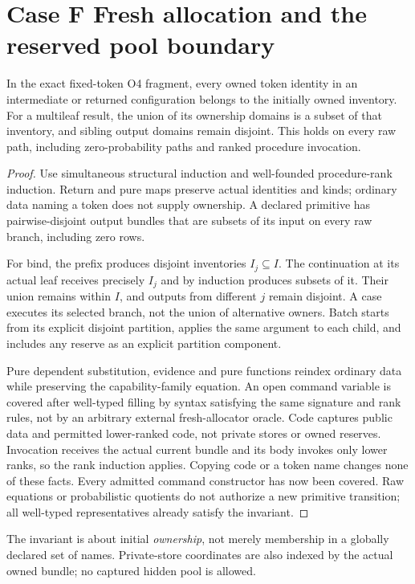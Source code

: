 \section{Case F Fresh allocation and the reserved pool boundary}\label{sec:caseF}

\begin{theorem}\label{thm:F}
In the exact fixed-token O4 fragment, every owned token identity in an
intermediate or returned configuration belongs to the initially owned
inventory. For a multileaf result, the union of its ownership domains is
a subset of that inventory, and sibling output domains remain disjoint.
This holds on every raw path, including zero-probability paths and ranked
procedure invocation.
\end{theorem}
\begin{proof}
Use simultaneous structural induction and well-founded procedure-rank
induction. Return and pure maps preserve actual identities and kinds;
ordinary data naming a token does not supply ownership. A declared
primitive has pairwise-disjoint output bundles that are subsets of its
input on every raw branch, including zero rows.

For bind, the prefix produces disjoint inventories $I_j\subseteq I$.
The continuation at its actual leaf receives precisely $I_j$ and by
induction produces subsets of it. Their union remains within $I$, and
outputs from different $j$ remain disjoint. A case executes its selected
branch, not the union of alternative owners. Batch starts from its
explicit disjoint partition, applies the same argument to each child,
and includes any reserve as an explicit partition component.

Pure dependent substitution, evidence and pure functions reindex ordinary
data while preserving the capability-family equation. An open command
variable is covered after well-typed filling by syntax satisfying the
same signature and rank rules, not by an arbitrary external fresh-allocator
oracle. Code captures public data and permitted lower-ranked code, not
private stores or owned reserves. Invocation receives the actual current
bundle and its body invokes only lower ranks, so the rank induction
applies. Copying code or a token name changes none of these facts.
Every admitted command constructor has now been covered. Raw equations
or probabilistic quotients do not authorize a new primitive transition;
all well-typed representatives already satisfy the invariant.
\end{proof}
The invariant is about initial \emph{ownership}, not merely membership
in a globally declared set of names. Private-store coordinates are also
indexed by the actual owned bundle; no captured hidden pool is allowed.

